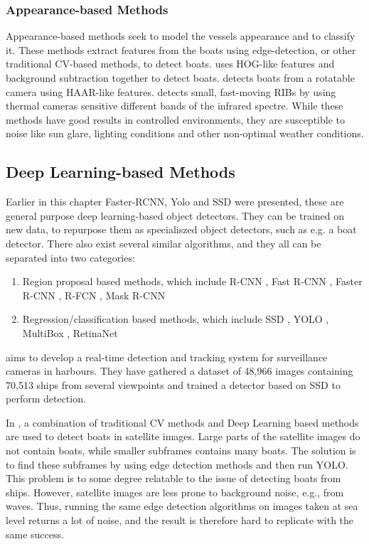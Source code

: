 \subsubsection{Appearance-based Methods}
Appearance-based methods seek to model the vessels appearance and to classify it. These methods extract features from the boats using edge-detection, or other traditional CV-based methods, to detect boats. \citep{HOGdetection} uses HOG-like features and background subtraction together to detect boats. \citep{HAARdetection} detects boats from a rotatable camera using HAAR-like features. \citep{RIBDetection} detects small, fast-moving RIBs by using thermal cameras sensitive different bands of the infrared spectre. While these methods have good results in controlled environments, they are susceptible to noise like sun glare, lighting conditions and other non-optimal weather conditions. 


\subsection{Deep Learning-based Methods}
Earlier in this chapter Faster-RCNN, Yolo and SSD were presented, these are general purpose deep learning-based object detectors. They can be trained on new data, to repurpose them as specialiszed object detectors, such as e.g. a boat detector. There also exist several similar algorithms, and they all can be separated into two categories:

\begin{enumerate}
\item Region proposal based methods, which include R-CNN \citep{R-CNN}, Fast R-CNN \citep{FastR-CNN}, Faster R-CNN \citep{FasterR-CNN}, R-FCN \citep{R-FCN}, Mask R-CNN \citep{MaskRCNN}
\item Regression/classification based methods, which include SSD \citep{SSD}, YOLO \citep{YOLOv1} \citep{YOLOv2} \citep{YOLOv3}, MultiBox \citep{Multibox}, RetinaNet \citep{Retinanet}
\end{enumerate}


\citep{SSD_detection2018} aims to develop a real-time detection and tracking system for surveillance cameras in harbours. They have gathered a dataset of 48,966 images containing 70,513 ships from several viewpoints and trained a detector based on SSD \citep{SSD} to perform detection. 

\vspace{3mm}

In \citep{VanEtten2018}, a combination of traditional CV methods and Deep Learning based methods are used to detect boats in satellite images. Large parts of the satellite images do not contain boats, while smaller subframes contains many boats. The solution is to find these subframes by using edge detection methods and then run YOLO. This problem is to some degree relatable to the issue of detecting boats from ships. However, satellite images are less prone to background noise, e.g., from waves. Thus, running the same edge detection algorithms on images taken at sea level returns a lot of noise, and the result is therefore hard to replicate with the same success.

